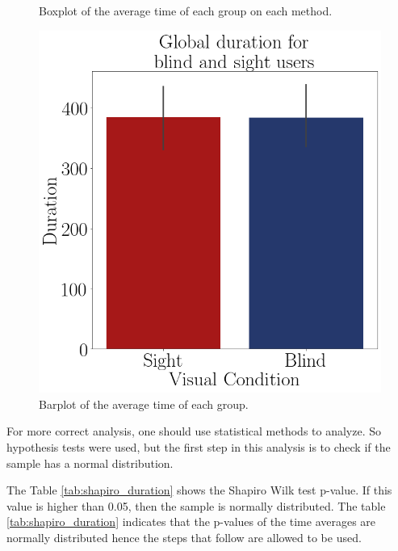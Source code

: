 \begin{figure}[!htb]
\begin{minipage}{.45\linewidth}
        \caption{Boxplot of the average time of each group on each method.}
        \label{fig:boxplot_duration_scene}
    \end{minipage}
    \begin{minipage}{.1\linewidth}
        \hfill
    \end{minipage}
    \begin{minipage}{.45\linewidth}
        \centering
        \vspace{1.8cm}
        \includegraphics[width = \linewidth]{Resultados/Tempo/Figuras/png/barplot_duration_global.png}
        \caption{Barplot of the average time of each group.}
        \label{fig:barplot_duration_global}
    \end{minipage}
\end{figure}

For more correct analysis, one should use statistical methods to analyze. So hypothesis tests were used, but the first step in this analysis is to check if the sample has a normal distribution. 

The Table \ref{tab:shapiro_duration} shows the Shapiro Wilk test p-value. If this value is higher than 0.05, then the sample is normally distributed. The table \ref{tab:shapiro_duration} indicates that the p-values of the time averages are normally distributed hence the steps that follow are allowed to be used.

